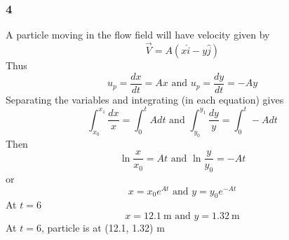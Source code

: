 \subsubsection{4}
A particle moving in the flow field will have velocity given by
\begin{equation}
  \vec{V} = A(x\hat{i} - y\hat{j})
\end{equation}
Thus
\begin{equation}
  u_p = \frac{dx}{dt} = Ax \textrm{ and } u_p = \frac{dy}{dt} = -Ay
\end{equation}
Separating the variables and integrating (in each equation) gives
\begin{equation}
  \int_{x_0}^{x_1} \frac{dx}{x} = \int_0^t A dt \textrm{ and } \int_{y_0}^{y_1} \frac{dy}{y} = \int_0^t -A dt
\end{equation}
Then
\begin{equation}
  \ln{\frac{x}{x_0}} = At \textrm{ and } \ln{\frac{y}{y_0}} = -At
\end{equation}
or
\begin{equation}
  x = x_0 e^{At} \textrm{ and } y = y_0 e^{-At}
\end{equation}
At $t=6$
\begin{equation}
  x = 12.1 \ \si{\meter} \textrm{ and } y = 1.32 \ \si{\meter}
\end{equation}
At $t=6$, particle is at (12.1, 1.32) \si{\meter}